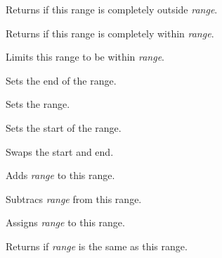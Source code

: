 \label{wxrichtextrangeisoutside}


Returns \true if this range is completely outside {\it range}.

\label{wxrichtextrangeiswithin}


Returns \true if this range is completely within {\it range}.

\label{wxrichtextrangelimitto}


Limits this range to be within {\it range}.

\label{wxrichtextrangesetend}


Sets the end of the range.

\label{wxrichtextrangesetrange}


Sets the range.

\label{wxrichtextrangesetstart}


Sets the start of the range.

\label{wxrichtextrangeswap}


Swaps the start and end.

\label{wxrichtextrangeoperatorplus}


Adds {\it range} to this range.

\label{wxrichtextrangeoperatorminus}


Subtracs {\it range} from this range.

\label{wxrichtextrangeoperatorassign}


Assigns {\it range} to this range.

\label{wxrichtextrangeoperatorequal}


Returns \true if {\it range} is the same as this range.
